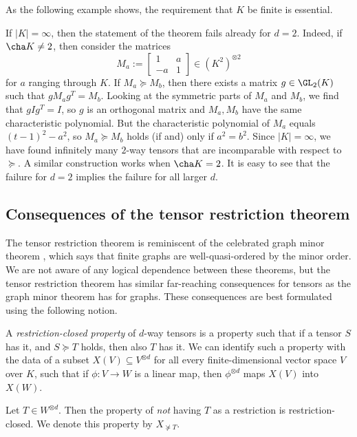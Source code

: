\documentclass{amsart}
\begin{document}
As the following example shows, the requirement that $K$ be
finite is essential. 

\begin{ex}
If $|K|=\infty$, then the statement of the theorem fails
already for $d=2$. Indeed, if $\cha K \neq 2$, then consider
the matrices
\[ M_a:=\begin{bmatrix} 1 & a \\ -a & 1 \end{bmatrix} \in
(K^2)^{\otimes 2}  \]
for $a$ ranging through $K$. If $M_a \succeq M_b$, then there exists
a matrix $g \in \GL_2(K)$ such that $g M_a g^T = M_b$. Looking at the
symmetric parts of $M_a$ and $M_b$, we find that $g I g^T=I$, so $g$
is an orthogonal matrix and $M_a,M_b$ have the same characteristic
polynomial. But the characteristic polynomial of $M_a$ equals $(t-1)^2
- a^2$, so $M_a \succeq M_b$ holds (if and) only if $a^2=b^2$. Since
$|K|=\infty$, we have found infinitely many $2$-way tensors that are
incomparable with respect to $\succeq$. A similar construction works
when $\cha K=2$. It is easy to see that the failure for $d=2$ implies
the failure for all larger $d$.
\end{ex}

\subsection{Consequences of the tensor restriction theorem}

The tensor restriction theorem is reminiscent of the celebrated graph
minor theorem \cite{Robertson04}, which says that finite graphs are
well-quasi-ordered by the minor order. We are not aware of any logical
dependence between these theorems, but the tensor restriction theorem
has similar far-reaching consequences for tensors as the graph minor
theorem has for graphs. These consequences are best formulated using
the following notion.

\begin{de}
A {\em restriction-closed property} of $d$-way tensors is a property such
that if a tensor $S$ has it, and $S \succeq T$ holds, then also $T$ has it. We
can identify such a property with the data of a subset $X(V) \subseteq
V^{\otimes d}$ for all every finite-dimensional vector space $V$ over $K$,
such that if $\phi:V \to W$ is a linear map, then $\phi^{\otimes d}$
maps $X(V)$ into $X(W)$. 
\end{de}

\begin{ex}
Let $T \in W^{\otimes d}$. Then the property of {\em not} having $T$ as
a restriction is restriction-closed. We denote this property by $X_{\not
\succeq T}$. 
\end{ex}
\end{document}
